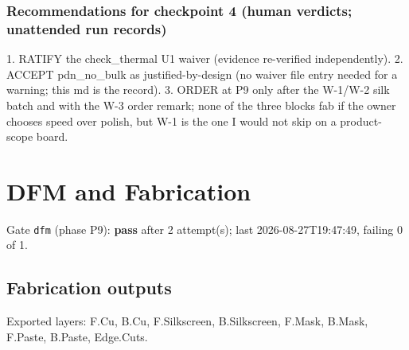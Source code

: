 \documentclass[11pt,a4paper]{article}
\begin{document}
\subsubsection*{Recommendations for checkpoint 4 (human verdicts; unattended run records)}
1. RATIFY the check\_thermal U1 waiver (evidence re-verified independently). 2. ACCEPT pdn\_no\_bulk as justified-by-design (no waiver file entry needed for a warning; this md is the record). 3. ORDER at P9 only after the W-1/W-2 silk batch and with the W-3 order remark; none of the three blocks fab if the owner chooses speed over polish, but W-1 is the one I would not skip on a product-scope board.

\section{DFM and Fabrication}
Gate \texttt{dfm} (phase P9): \textbf{pass} after 2 attempt(s); last 2026-08-27T19:47:49, failing 0 of 1.
\subsection*{Fabrication outputs}
Exported layers: F.Cu, B.Cu, F.Silkscreen, B.Silkscreen, F.Mask, B.Mask, F.Paste, B.Paste, Edge.Cuts.
\end{document}
